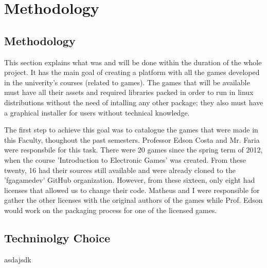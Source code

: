 \chapter[Methodology]{Methodology}
\section[Methodology]{Methodology}

This section explains what was and will be done within the duration of the whole
project. It has the main goal of creating a platform with all the games developed
in the univerity's courses (related to games). The games that will be available must have all their
assets and required libraries packed in order to run in linux distributions without the need
of intalling any other package; they also must have a graphical installer for users
without technical knowledge.

The first step to achieve this goal was to catalogue the games that were made in
this Faculty, thoughout the past semesters. Professor Edson Costa and Mr. Faria were
responsbile for this task. There were 20 games since the spring term of 2012,
when the course 'Introduction to Electronic Games' was created. From these twenty,
16 had their sources still available and were already cloned to the 'fgagamedev'
GitHub organization. However, from these sixteen, only eight had licenses that
allowed us to change their code. Matheus and I were responsible for gather the other
licenses with the original authors of the games while Prof. Edson would work on
the packaging process for one of the licensed games.


\section[Techninolgy Choice]{Techninolgy Choice}
asdajsdk
